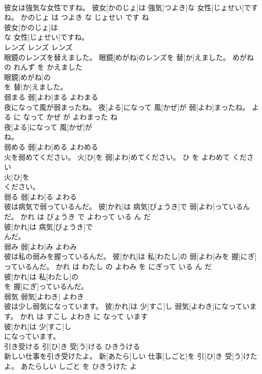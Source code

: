 \documentclass[8pt]{extreport}
\begin{document}
\begin{CJK}{UTF8}{min}
\\	彼女は強気な女性ですね。	彼女[かのじょ]は 強気[つよき]な 女性[じょせい]ですね。	かのじょ は つよき な じょせい です ね	
\\	彼女[かのじょ]は
\\	な 女性[じょせい]ですね。			
\\	レンズ	レンズ	レンズ	
\\	眼鏡のレンズを替えました。	眼鏡[めがね]のレンズを 替[か]えました。	めがね の れんず を かえました	
\\	眼鏡[めがね]の
\\	を 替[か]えました。			
\\	弱まる	弱[よわ]まる	よわまる	
\\	夜になって風が弱まったね。	夜[よる]になって 風[かぜ]が 弱[よわ]まったね。	よる に なって かぜ が よわまった ね	
\\	夜[よる]になって 風[かぜ]が
\\	ね。			
\\	弱める	弱[よわ]める	よわめる	
\\	火を弱めてください。	火[ひ]を 弱[よわ]めてください。	ひ を よわめて ください	
\\	火[ひ]を
\\	ください。			
\\	弱る	弱[よわ]る	よわる	
\\	彼は病気で弱っているんだ。	彼[かれ]は 病気[びょうき]で 弱[よわ]っているんだ。	かれ は びょうき で よわって いる ん だ	
\\	彼[かれ]は 病気[びょうき]で
\\	んだ。			
\\	弱み	弱[よわ]み	よわみ	
\\	彼は私の弱みを握っているんだ。	彼[かれ]は 私[わたし]の 弱[よわ]みを 握[にぎ]っているんだ。	かれ は わたし の よわみ を にぎって いる ん だ	
\\	彼[かれ]は 私[わたし]の
\\	を 握[にぎ]っているんだ。			
\\	弱気	弱気[よわき]	よわき	
\\	彼は少し弱気になっています。	彼[かれ]は 少[すこ]し 弱気[よわき]になっています。	かれ は すこし よわき に なって います	
\\	彼[かれ]は 少[すこ]し
\\	になっています。			
\\	引き受ける	引[ひ]き 受[う]ける	ひきうける	
\\	新しい仕事を引き受けたよ。	新[あたら]しい 仕事[しごと]を 引[ひ]き 受[う]けたよ。	あたらしい しごと を ひきうけた よ	

\end{CJK}
\end{document}
